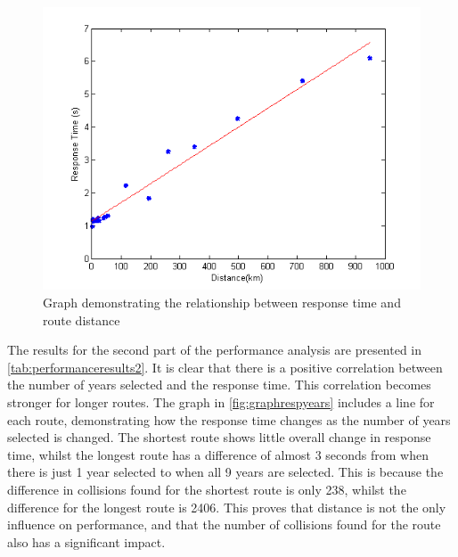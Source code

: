\documentclass[authoryearcitations]{UoYCSproject}
\begin{document}
\begin{figure}
	\center
	\includegraphics[scale=1]{performance-distance-responsetime}
	\caption{Graph demonstrating the relationship between response time and route distance}
	\label{fig:graphrespdist}
\end{figure}

The results for the second part of the performance analysis are presented in \autoref{tab:performanceresults2}. It is clear that there is a positive correlation between the number of years selected and the response time. This correlation becomes stronger for longer routes. The graph in \autoref{fig:graphrespyears} includes a line for each route, demonstrating how the response time changes as the number of years selected is changed. The shortest route shows little overall change in response time, whilst the longest route has a difference of almost 3 seconds from when there is just 1 year selected to when all 9 years are selected. This is because the difference in collisions found for the shortest route is only 238, whilst the difference for the longest route is 2406. This proves that distance is not the only influence on performance, and that the number of collisions found for the route also has a significant impact.
\end{document}
